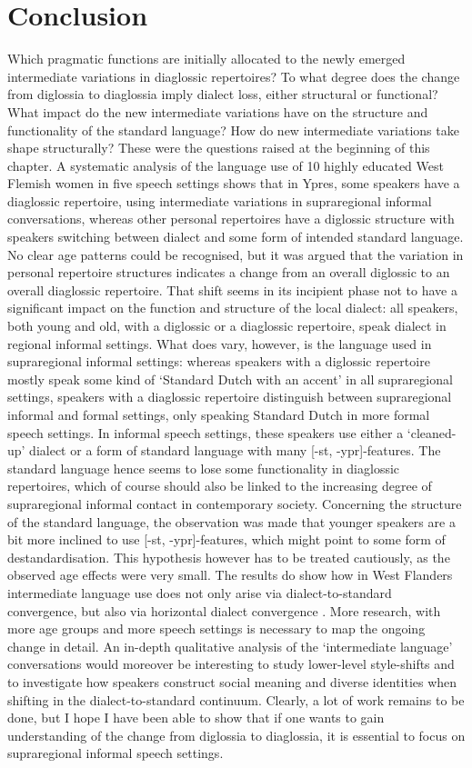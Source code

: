 \documentclass[output=paper]{LSP/langsci}
\begin{document}
\section{Conclusion}
\label{sec:conclusion}
Which pragmatic functions are initially allocated to the newly emerged intermediate variations in diaglossic repertoires? To what degree does the change from diglossia to diaglossia imply dialect loss, either structural or functional? What impact do the new intermediate variations have on the structure and functionality of the standard language? How do new intermediate variations take shape structurally? These were the questions raised at the beginning of this chapter. A systematic analysis of the language use of 10 highly educated West Flemish women in five speech settings shows that in Ypres, some speakers have a diaglossic repertoire, using intermediate variations in supraregional informal conversations, whereas other personal repertoires have a diglossic structure with speakers switching between dialect and some form of intended standard language. No clear age patterns could be recognised, but it was argued that the variation in personal repertoire structures indicates a change from an overall diglossic to an overall diaglossic repertoire. That shift seems in its incipient phase not to have a significant impact on the function and structure of the local dialect: all speakers, both young and old, with a diglossic or a diaglossic repertoire, speak dialect in regional informal settings. What does vary, however, is the language used in supraregional informal settings: whereas speakers with a diglossic repertoire mostly speak some kind of ‘Standard Dutch with an accent’ in all supraregional settings, speakers with a diaglossic repertoire distinguish between supraregional informal and formal settings, only speaking Standard Dutch in more formal speech settings. In informal speech settings, these speakers use either a ‘cleaned-up’ dialect or a form of standard language with many [-st, -ypr]-features. The standard language hence seems to lose some functionality in diaglossic repertoires, which of course should also be linked to the increasing degree of supraregional informal contact in contemporary society. Concerning the structure of the standard language, the observation was made that younger speakers are a bit more inclined to use [-st, -ypr]-features, which might point to some form of destandardisation. This hypothesis however has to be treated cautiously, as the observed age effects were very small. The results do show how in West Flanders intermediate language use does not only arise via dialect-to-standard convergence, but also via horizontal dialect convergence \citep{auer_convergence_1996}. More research, with more age groups and more speech settings is necessary to map the ongoing change in detail. An in-depth qualitative analysis of the ‘intermediate language’ conversations would moreover be interesting to study lower-level style-shifts and to investigate how speakers construct social meaning and diverse identities when shifting in the dialect-to-standard continuum. Clearly, a lot of work remains to be done, but I hope I have been able to show that if one wants to gain understanding of the change from diglossia to diaglossia, it is essential to focus on supraregional informal speech settings. 

\printbibliography[heading=subbibliography,notkeyword=this]
\end{document}
